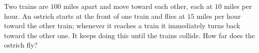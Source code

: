 Two trains are $100$ miles apart and move toward each other, each at $10$ miles per hour. An ostrich starts at the front of one train and flies at $15$ miles per hour toward the other train; whenever it reaches a train it immediately turns back toward the other one. It keeps doing this until the trains collide. How far does the ostrich fly?
